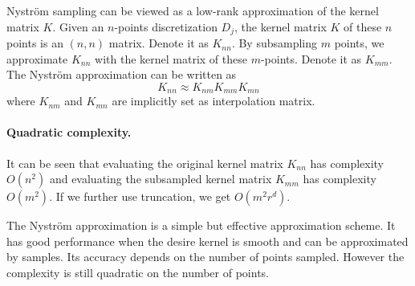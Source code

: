 Nystr\"om sampling can be viewed as a low-rank approximation of the kernel matrix $K$. Given an $n$-points discretization $D_j$, the kernel matrix $K$ of these $n$ points is an $(n,n)$ matrix. Denote it as $K_{nn}$. By subsampling $m$ points, we approximate $K_{nn}$ with the kernel matrix of these $m$-points. Denote it as $K_{mm}$. The Nystr\"om approximation can be written as
\begin{equation}
\label{eq:nystrom_matrix}
 K_{nn} \approx K_{nm} K_{mm} K_{mn}
\end{equation}
where $K_{nm}$ and $K_{mn}$ are implicitly set as interpolation matrix.

\paragraph{Quadratic complexity.}
It can be seen that evaluating the original kernel matrix $K_{nn}$ has complexity $O(n^2)$ and evaluating the subsampled kernel matrix $K_{mm}$ has complexity $O(m^2)$. If we further use truncation, we get $O(m^2 r^d)$.

The Nystr\"om approximation is a simple but effective approximation scheme. It has good performance when the desire kernel is smooth and can be approximated by samples. Its accuracy depends on the number of points sampled. However the complexity is still quadratic on the number of points.

\fi